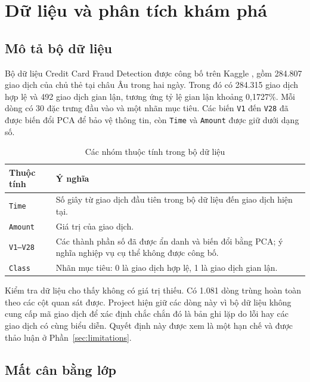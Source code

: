 \documentclass[12pt,a4paper]{article}
\begin{document}
\section{Dữ liệu và phân tích khám phá}

\subsection{Mô tả bộ dữ liệu}

Bộ dữ liệu Credit Card Fraud Detection được công bố trên Kaggle \cite{kaggledata}, gồm 284.807 giao dịch của chủ thẻ tại châu Âu trong hai ngày. Trong đó có 284.315 giao dịch hợp lệ và 492 giao dịch gian lận, tương ứng tỷ lệ gian lận khoảng 0,1727\%. Mỗi dòng có 30 đặc trưng đầu vào và một nhãn mục tiêu. Các biến \texttt{V1} đến \texttt{V28} đã được biến đổi PCA để bảo vệ thông tin, còn \texttt{Time} và \texttt{Amount} được giữ dưới dạng số.

\begin{table}[H]
    \centering
    \begin{tabular}{p{3cm}p{11.2cm}}
        \toprule
        \textbf{Thuộc tính} & \textbf{Ý nghĩa} \\
        \midrule
        \texttt{Time} & Số giây từ giao dịch đầu tiên trong bộ dữ liệu đến giao dịch hiện tại. \\
        \texttt{Amount} & Giá trị của giao dịch. \\
        \texttt{V1--V28} & Các thành phần số đã được ẩn danh và biến đổi bằng PCA; ý nghĩa nghiệp vụ cụ thể không được công bố. \\
        \texttt{Class} & Nhãn mục tiêu: 0 là giao dịch hợp lệ, 1 là giao dịch gian lận. \\
        \bottomrule
    \end{tabular}
    \caption{Các nhóm thuộc tính trong bộ dữ liệu}
\end{table}

Kiểm tra dữ liệu cho thấy không có giá trị thiếu. Có 1.081 dòng trùng hoàn toàn theo các cột quan sát được. Project hiện giữ các dòng này vì bộ dữ liệu không cung cấp mã giao dịch để xác định chắc chắn đó là bản ghi lặp do lỗi hay các giao dịch có cùng biểu diễn. Quyết định này được xem là một hạn chế và được thảo luận ở Phần~\ref{sec:limitations}.

\subsection{Mất cân bằng lớp}
\end{document}
